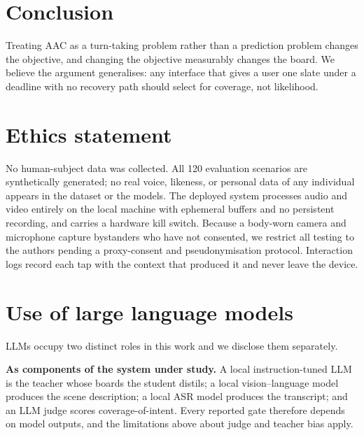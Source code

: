 \documentclass{article}
\begin{document}
\section{Conclusion}

Treating AAC as a turn-taking problem rather than a prediction problem changes
the objective, and changing the objective measurably changes the board. We
believe the argument generalises: any interface that gives a user one slate under
a deadline with no recovery path should select for coverage, not likelihood.

\section*{Ethics statement}

No human-subject data was collected. All 120 evaluation scenarios are
synthetically generated; no real voice, likeness, or personal data of any
individual appears in the dataset or the models. The deployed system processes
audio and video entirely on the local machine with ephemeral buffers and no
persistent recording, and carries a hardware kill switch. Because a body-worn
camera and microphone capture bystanders who have not consented, we restrict all
testing to the authors pending a proxy-consent and pseudonymisation protocol.
Interaction logs record each tap with the context that produced it and never
leave the device.

\section*{Use of large language models}

LLMs occupy two distinct roles in this work and we disclose them separately.

\textbf{As components of the system under study.} A local instruction-tuned LLM
is the teacher whose boards the student distils; a local vision--language model
produces the scene description; a local ASR model produces the transcript; and
an LLM judge scores coverage-of-intent. Every reported gate therefore depends on
model outputs, and the limitations above about judge and teacher bias apply.
\end{document}
